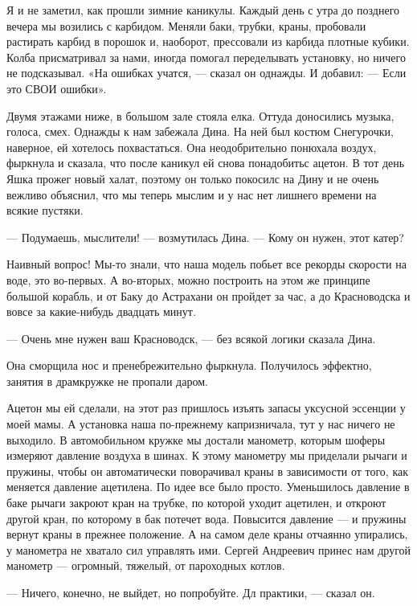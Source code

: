 Я и не заметил, как прошли зимние каникулы. Каждый день с утра до позднего
вечера мы  возились  с карбидом.  Меняли  баки, трубки,  краны,  пробовали
растирать карбид  в порошок  и, наоборот,  прессовали из  карбида  плотные
кубики. Колба присматривал за нами, иногда помогал переделывать установку,
но ничего  не подсказывал.  «На ошибках  учатся, —  сказал он  однажды.  И
добавил: — Если это СВОИ ошибки».

Двумя этажами ниже, в большом зале стояла елка. Оттуда доносились  музыка,
голоса, смех. Однажды к нам забежала  Дина. На ней был костюм  Снегурочки,
наверное, ей хотелось  похвастаться. Она  неодобрительно понюхала  воздух,
фыркнула и сказала, что после каникул  ей снова понадобитьс ацетон. В  тот
день Яшка прожег  новый халат,  поэтому он только  покосилс на  Дину и  не
очень вежливо объяснил, что мы теперь  мыслим и у нас нет лишнего  времени
на всякие пустяки.

— Подумаешь, мыслители! — возмутилась Дина. — Кому он нужен, этот катер?

Наивный вопрос! Мы-то знали, что  наша модель побьет все рекорды  скорости
на воде, это во-первых. А во-вторых,  можно построить на этом же  принципе
большой корабль,  и  от  Баку  до  Астрахани  он  пройдет  за  час,  а  до
Красноводска и вовсе за какие-нибудь двадцать минут.

— Очень мне нужен ваш Красноводск, — без всякой логики сказала Дина.

Она сморщила нос и пренебрежительно фыркнула. Получилось эффектно, занятия
в драмкружке не пропали даром.

Ацетон мы ей сделали, на этот раз пришлось изъять запасы уксусной эссенции
у моей мамы. А установка наша  по-прежнему капризничала, тут у нас  ничего
не выходило. В  автомобильном кружке мы  достали манометр, которым  шоферы
измеряют давление воздуха в шинах. К этому манометру мы приделали рычаги и
пружины, чтобы он автоматически поворачивал  краны в зависимости от  того,
как меняется  давление ацетилена.  По идее  все было  просто.  Уменьшилось
давление в баке рычаги закроют кран на трубке, по которой уходит ацетилен,
и откроют другой кран, по которому в бак потечет вода. Повысится  давление
— и  пружины вернут  краны в  прежнее  положение. А  на самом  деле  краны
отчаянно упирались,  у  манометра не  хватало  сил управлять  ими.  Сергей
Андреевич принес нам  другой манометр —  огромный, тяжелый, от  пароходных
котлов.

— Ничего, конечно, не выйдет, но попробуйте. Дл практики, — сказал он.

